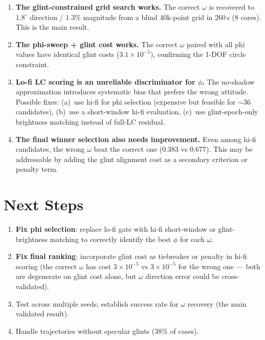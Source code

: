 \documentclass[11pt,a4paper]{article}
\begin{document}
\begin{enumerate}[nosep]
  \item \textbf{The glint-constrained grid search works.} The correct $\omega$
    is recovered to $1.8^\circ$ direction / $1.3\%$ magnitude from a blind 40k-point
    grid in 260\,s (8 cores). This is the main result.
  \item \textbf{The phi-sweep + glint cost works.} The correct $\omega$ paired with
    all phi values have identical glint costs ($3.1 \times 10^{-5}$), confirming
    the 1-DOF circle constraint.
  \item \textbf{Lo-fi LC scoring is an unreliable discriminator for $\phi$.}
    The no-shadow approximation introduces systematic bias that prefers the wrong
    attitude. Possible fixes: (a)~use hi-fi for phi selection (expensive but
    feasible for ${\sim}36$ candidates), (b)~use a short-window hi-fi evaluation,
    (c)~use glint-epoch-only brightness matching instead of full-LC residual.
  \item \textbf{The final winner selection also needs improvement.} Even among
    hi-fi candidates, the wrong $\omega$ beat the correct one (0.383 vs 0.677).
    This may be addressable by adding the glint alignment cost as a secondary
    criterion or penalty term.
\end{enumerate}

\section{Next Steps}

\begin{enumerate}[nosep]
  \item \textbf{Fix phi selection}: replace lo-fi gate with hi-fi short-window
    or glint-brightness matching to correctly identify the best $\phi$ for each $\omega$.
  \item \textbf{Fix final ranking}: incorporate glint cost as tiebreaker or penalty
    in hi-fi scoring (the correct $\omega$ has cost $3 \times 10^{-5}$ vs $3 \times 10^{-5}$
    for the wrong one --- both are degenerate on glint cost alone, but
    $\omega$ direction error could be cross-validated).
  \item Test across multiple seeds; establish success rate for $\omega$ recovery
    (the main validated result).
  \item Handle trajectories without specular glints (38\% of cases).
\end{enumerate}
\end{document}
